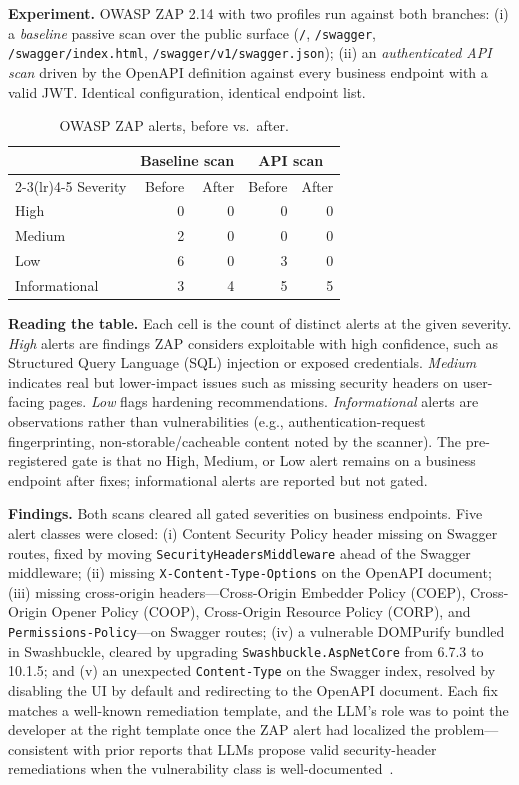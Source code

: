 \documentclass[conference,letterpaper]{IEEEtran}
\begin{document}
\textbf{Experiment.} OWASP ZAP 2.14 with two profiles run against both branches: (i) a \emph{baseline} passive scan over the public surface (\texttt{/}, \texttt{/swagger}, \texttt{/swagger/index.html}, \texttt{/swagger/v1/swagger.json}); (ii) an \emph{authenticated API scan} driven by the OpenAPI definition against every business endpoint with a valid JWT. Identical configuration, identical endpoint list.

\begin{table}[t]
\caption{OWASP ZAP alerts, before vs.\ after.}
\label{tab:zap}
\centering
\begin{tabular}{lrrrr}
\toprule
 & \multicolumn{2}{c}{Baseline scan} & \multicolumn{2}{c}{API scan} \\
\cmidrule(lr){2-3}\cmidrule(lr){4-5}
Severity & Before & After & Before & After \\
\midrule
High          & 0 & 0 & 0 & 0 \\
Medium        & 2 & 0 & 0 & 0 \\
Low           & 6 & 0 & 3 & 0 \\
Informational & 3 & 4 & 5 & 5 \\
\bottomrule
\end{tabular}
\end{table}

\textbf{Reading the table.} Each cell is the count of distinct alerts at the given severity. \emph{High} alerts are findings ZAP considers exploitable with high confidence, such as Structured Query Language (SQL) injection or exposed credentials. \emph{Medium} indicates real but lower-impact issues such as missing security headers on user-facing pages. \emph{Low} flags hardening recommendations. \emph{Informational} alerts are observations rather than vulnerabilities (e.g., authentication-request fingerprinting, non-storable/cacheable content noted by the scanner). The pre-registered gate is that no High, Medium, or Low alert remains on a business endpoint after fixes; informational alerts are reported but not gated.

\textbf{Findings.} Both scans cleared all gated severities on business endpoints. Five alert classes were closed: (i) Content Security Policy header missing on Swagger routes, fixed by moving \texttt{SecurityHeadersMiddleware} ahead of the Swagger middleware; (ii) missing \texttt{X-Content-Type-Options} on the OpenAPI document; (iii) missing cross-origin headers---Cross-Origin Embedder Policy (COEP), Cross-Origin Opener Policy (COOP), Cross-Origin Resource Policy (CORP), and \texttt{Permissions-Policy}---on Swagger routes; (iv) a vulnerable DOMPurify bundled in Swashbuckle, cleared by upgrading \texttt{Swashbuckle.AspNetCore} from 6.7.3 to 10.1.5; and (v) an unexpected \texttt{Content-Type} on the Swagger index, resolved by disabling the UI by default and redirecting to the OpenAPI document. Each fix matches a well-known remediation template, and the LLM's role was to point the developer at the right template once the ZAP alert had localized the problem---consistent with prior reports that LLMs propose valid security-header remediations when the vulnerability class is well-documented~\cite{ref7,ref11}.
\end{document}
